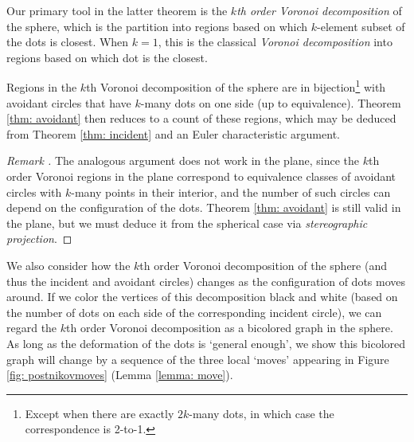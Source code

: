 \documentclass[11pt,oneside]{amsart}
\theoremstyle{definition}
\theoremstyle{remark}
\newenvironment{rem}{\refstepcounter{thm}\begin{proof}[Remark \emph{\thethm}]\renewcommand*{\qedsymbol}{\(\blacksquare\)}}{\end{proof}}
\numberwithin{equation}{section}
\begin{document}

Our primary tool in the latter theorem is the \emph{$k$th order Voronoi decomposition} of the sphere, which is the partition into regions based on which $k$-element subset of the dots is closest.
When $k=1$, this is the classical \emph{Voronoi decomposition} into regions based on which dot is the closest.

Regions in the $k$th Voronoi decomposition of the sphere are in bijection\footnote{Except when there are exactly $2k$-many dots, in which case the correspondence is 2-to-1.} with avoidant circles that have $k$-many dots on one side (up to equivalence). Theorem \ref{thm: avoidant} then reduces to a count of these regions, which may be deduced from Theorem \ref{thm: incident} and an Euler characteristic argument.

\begin{rem}
The analogous argument does not work in the plane, since the $k$th order Voronoi regions in the plane correspond to equivalence classes of avoidant circles with $k$-many points in their interior, and the number of such circles can depend on the configuration of the dots.
%
Theorem \ref{thm: avoidant} is still valid in the plane, but we must deduce it from the spherical case via \emph{stereographic projection}.
\end{rem}

We also consider how the $k$th order Voronoi decomposition of the sphere (and thus the incident and avoidant circles) changes as the configuration of dots moves around. If we color the vertices of this decomposition black and white (based on the number of dots on each side of the corresponding incident circle), we can regard the $k$th order Voronoi decomposition as a bicolored graph in the sphere. 
%
%
As long as the deformation of the dots is `general enough', we show this bicolored graph will change by a sequence of the three local `moves' appearing in Figure \ref{fig: postnikovmoves} (Lemma \ref{lemma: move}). 
\end{document}
